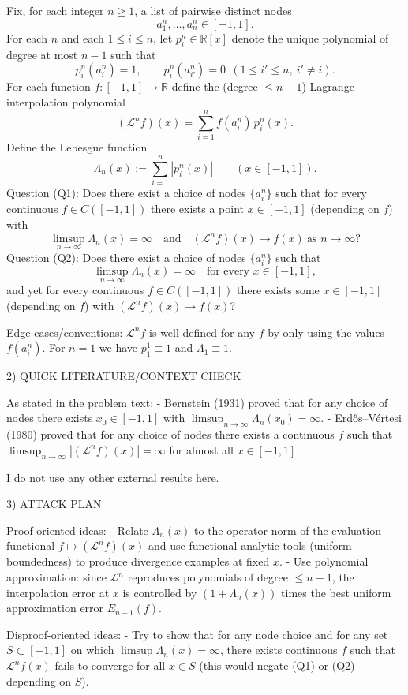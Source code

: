 Fix, for each integer $n\ge 1$, a list of pairwise distinct nodes
\[
 a_1^n,\dots,a_n^n\in[-1,1].
\]
For each $n$ and each $1\le i\le n$, let $p_i^n\in\mathbb R[x]$ denote the unique polynomial of degree at most $n-1$ such that
\[
 p_i^n(a_i^n)=1,\qquad p_i^n(a_{i'}^n)=0\ \ (1\le i'\le n,\ i'\ne i).
\]
For each function $f:[-1,1]\to\mathbb R$ define the (degree $\le n-1$) Lagrange interpolation polynomial
\[
 (\mathcal L^n f)(x)=\sum_{i=1}^n f(a_i^n)\,p_i^n(x).
\]
Define the Lebesgue function
\[
 \Lambda_n(x):=\sum_{i=1}^n |p_i^n(x)|\qquad(x\in[-1,1]).
\]
Question (Q1): Does there exist a choice of nodes $\{a_i^n\}$ such that for every continuous $f\in C([-1,1])$ there exists a point $x\in[-1,1]$ (depending on $f$) with
\[
 \limsup_{n\to\infty} \Lambda_n(x)=\infty\quad\text{and}\quad (\mathcal L^n f)(x)\to f(x)\ \text{as }n\to\infty?
\]
Question (Q2): Does there exist a choice of nodes $\{a_i^n\}$ such that
\[
 \limsup_{n\to\infty}\Lambda_n(x)=\infty\quad\text{for every }x\in[-1,1],
\]
and yet for every continuous $f\in C([-1,1])$ there exists some $x\in[-1,1]$ (depending on $f$) with $(\mathcal L^n f)(x)\to f(x)$?

Edge cases/conventions: $\mathcal L^n f$ is well-defined for any $f$ by only using the values $f(a_i^n)$. For $n=1$ we have $p_1^1\equiv 1$ and $\Lambda_1\equiv 1$.

2) QUICK LITERATURE/CONTEXT CHECK

As stated in the problem text:
- Bernstein (1931) proved that for any choice of nodes there exists $x_0\in[-1,1]$ with $\limsup_{n\to\infty}\Lambda_n(x_0)=\infty$.
- Erd\H{o}s--V\'{e}rtesi (1980) proved that for any choice of nodes there exists a continuous $f$ such that $\limsup_{n\to\infty}|(\mathcal L^n f)(x)|=\infty$ for almost all $x\in[-1,1]$.

I do not use any other external results here.

3) ATTACK PLAN

Proof-oriented ideas:
- Relate $\Lambda_n(x)$ to the operator norm of the evaluation functional $f\mapsto (\mathcal L^n f)(x)$ and use functional-analytic tools (uniform boundedness) to produce divergence examples at fixed $x$.
- Use polynomial approximation: since $\mathcal L^n$ reproduces polynomials of degree $\le n-1$, the interpolation error at $x$ is controlled by $(1+\Lambda_n(x))$ times the best uniform approximation error $E_{n-1}(f)$.

Disproof-oriented ideas:
- Try to show that for any node choice and for any set $S\subset[-1,1]$ on which $\limsup\Lambda_n(x)=\infty$, there exists continuous $f$ such that $\mathcal L^n f(x)$ fails to converge for all $x\in S$ (this would negate (Q1) or (Q2) depending on $S$).

